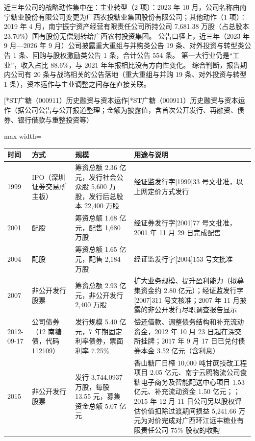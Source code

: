  近三年公司的战略动作集中在：主业转型（2 项）：2023 年 10 月，公司名称由南宁糖业股份有限公司变更为广西农投糖业集团股份有限公司；其他动作（1 项）：2019 年 4 月，南宁振宁资产经营有限责任公司所持公司 7,681.38 万股（占总股本 23.70\%）国有股份无偿划转给广西农村投资集团。 公告口径上，近三年（2023 年 9 月---2026 年 9 月）公司披露重大重组与并购类公告 19 条、对外投资与转型类公告 1 条、回购与股权激励类公告 1 条，合计公告 554 条。 第一大行业仍是“工业”，收入占比 88.6\%，与 2021 年年报相比没有方向性变化。 综合判断，报告期内公司有 20 条与战略相关的公告落地（重大重组与并购 19 条、对外投资与转型 1 条），资本运作与主业调整之间存在直接关联。

\begin{center}\small\setlength{\tabcolsep}{4pt}
[*ST广糖（000911）历史融资与资本运作]{*ST广糖（000911）历史融资与资本运作（据公司公告与公开报道整理；金额为披露值，含首次公开发行、再融资、债券、银行借款与重整投资等）}
\begin{adjustbox}{max width=\textwidth}
\begin{tabular}{@{}p{1.45cm}p{2.55cm}p{4.05cm}p{4.95cm}@{}}
\toprule
时间 & 方式 & 规模 & 用途与说明 \\
\midrule
1999 & IPO（深圳证券交易所主板） & 筹资总额 2.36 亿元，\allowbreak{}发行社会公众股 5,\allowbreak{}600 万股，\allowbreak{}发行后总股本 22,\allowbreak{}400 万股 & 经证监发行字[1999]33 号文批准，\allowbreak{}以上网定价方式发行 \\
2001 & 配股 & 筹资总额 1.68 亿元，\allowbreak{}配售 1,\allowbreak{}680 万股 & 经证券发行字[2001]77 号文批准，\allowbreak{}2001 年 11 月 29 日完成配售 \\
2004 & 配股 & 筹资总额 1.65 亿元，\allowbreak{}配售 2,\allowbreak{}184 万股 & 经证监发行字[2004]153 号文批准 \\
2007 & 非公开发行股票 & 筹资总额 2.93 亿元，\allowbreak{}非公开发行 2,\allowbreak{}400 万股 & 扩大业务规模、\allowbreak{}提升盈利能力（拟募集资金约 2.80 亿元）；经证监发行字[2007]311 号文核准；2007 年 11 月披露的非公开发行尽职调查报告显示 \\
2012-09-17 & 公司债券（12 南糖债，代码 112109） & 发行规模 5.40 亿元，\allowbreak{}7 年期固定利率债券，\allowbreak{}票面利率 7.25\% & 偿还借款、\allowbreak{}调整债务结构和补充流动资金，\allowbreak{}2012 年 10 月 23 日起在深交所挂牌；2017 年 9 月 17 日已兑付债券本金 3.52 亿元（含利息） \\
2015 & 非公开发行股票 & 发行 3,\allowbreak{}744.0937 万股，\allowbreak{}每股 13.55 元，\allowbreak{}募集资金总额 5.07 亿元 & 香山糖厂日榨 10,\allowbreak{}000 吨甘蔗技改工程项目 2.05 亿元、\allowbreak{}南宁云鸥物流公司食糖电子商务及智能配送中心项目 1.53 亿元、\allowbreak{}补充流动资金 1.50 亿元；；2015 年 12 月 11 日公司另以股权评估价值扣除过渡期间损益 5,\allowbreak{}241.66 万元为对价完成对广西环江远丰糖业有限责任公司 75\% 股权的收购 \\

\end{tabular}
\end{adjustbox}
\end{center}
